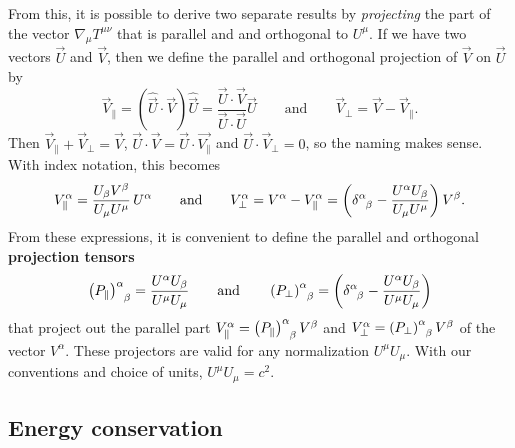 From this, it is possible to derive two separate results by \emph{projecting} the part of the vector $\nabla_\mu T^{\mu \nu}$ that is parallel and and orthogonal to $U^\mu$.
If we have two vectors $\vec{U}$ and $\vec{V}$, then we define the parallel and orthogonal projection of $\vec{V}$ on $\vec{U}$ by
\begin{equation}
	\vec{V}_\parallel = \left( \hat{\vec{U}} \cdot \vec{V} \right) \hat{\vec{U}} = \frac{\vec{U} \cdot \vec{V}}{\vec{U} \cdot \vec{U}} \vec{U}
	\qquad \text{and} \qquad
	\vec{V}_\perp = \vec{V} - \vec{V}_\parallel .
\end{equation}
Then $\vec{V}_\parallel + \vec{V}_\perp = \vec{V}$, $\vec{U} \cdot \vec{V} = \vec{U} \cdot \vec{V_\parallel}$ and $\vec{U} \cdot \vec{V}_\perp = 0$, so the naming makes sense.
With index notation, this becomes
\begin{equation}
	V_\parallel^\alpha = \frac{U_\beta V^\beta}{U_\mu U^\mu} \, U^\alpha
	\qquad \text{and} \qquad
	V_\perp^\alpha = V^\alpha - V_\parallel^\alpha = \left( \delta\indices{^\alpha_\beta} - \frac{U^\alpha U_\beta}{U_\mu U^\mu} \right) V^\beta .
\end{equation}
From these expressions, it is convenient to define the parallel and orthogonal \textbf{projection tensors}
\begin{equation}
	\left(P_\parallel\right) \indices{^\alpha_\beta} = \frac{U^\alpha U_\beta}{U^\mu U_\mu}
	\qquad \text{and} \qquad
	\left(P_\perp\right) \indices{^\alpha_\beta} = \left( \delta\indices{^\alpha_\beta} - \frac{U^\alpha U_\beta}{U^\mu U_\mu} \right)
\label{eq:relfluid:projection_tensors}
\end{equation}
that project out the parallel part $V_\parallel^\alpha = \left(P_\parallel\right)\indices{^\alpha_\beta} V^\beta$ and $V_\perp^\alpha = \left(P_\perp\right)\indices{^\alpha_\beta} V^\beta$ of the vector $V^\alpha$.
These projectors are valid for any normalization $U^\mu U_\mu$.
With our conventions and choice of units, $U^\mu U_\mu = c^2$.

\subsection{Energy conservation}

